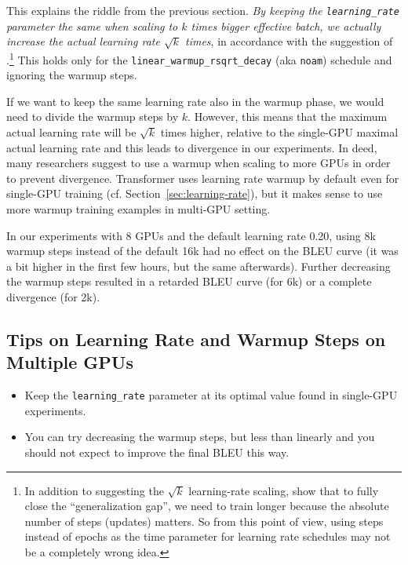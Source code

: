 \documentclass{pbmlarxiv} \pdfoutput=1
\def\recommend#1{\textsl{#1}}
\def\Sref#1{Section~\ref{#1}}
\begin{document}
This explains the riddle from the previous section.
\recommend{By keeping the \texttt{learning\_rate} parameter the same
 when scaling to $k$ times bigger effective batch,
 we actually increase the actual learning rate $\sqrt{k}$ times},
 in accordance with the suggestion of \citet{hoffer-et-al-2017}.\footnote{
  In addition to suggesting the $\sqrt{k}$ learning-rate scaling,
   \citet{hoffer-et-al-2017} show that to fully close the ``generalization gap'',
   we need to train longer because the absolute number of steps (updates) matters.
  So from this point of view, using steps instead of epochs as the time parameter
   for learning rate schedules may not be a completely wrong idea.
 }
This holds only for the \texttt{linear\_warmup\_rsqrt\_decay} (aka \texttt{noam}) schedule
 and ignoring the warmup steps.

If we want to keep the same learning rate also in the warmup phase,
 we would need to divide the warmup steps by $k$.
However, this means that the maximum actual learning rate will be $\sqrt{k}$ times higher,
 relative to the single-GPU maximal actual learning rate
 and this leads to divergence in our experiments.
In deed, many researchers \citep[e.g.][]{goyal-et-al:2017} suggest to use a warmup
 when scaling to more GPUs in order to prevent divergence.
Transformer uses learning rate warmup by default even for single-GPU training
 (cf. \Sref{sec:learning-rate}),
 but it makes sense to use more warmup training examples in multi-GPU setting.

In our experiments with 8 GPUs and the default learning rate 0.20,
 using 8k warmup steps instead of the default 16k had no effect on the BLEU curve
 (it was a bit higher in the first few hours, but the same afterwards).
Further decreasing the warmup steps resulted in a retarded BLEU curve (for 6k)
 or a complete divergence (for 2k).

\subsection*{Tips on Learning Rate and Warmup Steps on Multiple GPUs}
\begin{itemize}
\item Keep the \texttt{learning\_rate} parameter at its optimal value found in single-GPU experiments.
\item You can try decreasing the warmup steps, but less than linearly
 and you should not expect to improve the final BLEU this way.
\end{itemize}
\end{document}
